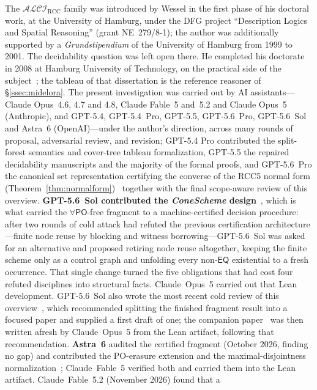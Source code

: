 \documentclass[11pt]{article}
\newcommand{\ALCIRCC}[1]{\mathcal{ALCI}_{\mathrm{RCC#1}}}
\newcommand{\PO}{\mathsf{PO}}
\newcommand{\EQ}{\mathsf{EQ}}
\theoremstyle{plain}
\theoremstyle{definition}
\begin{document}
The $\ALCIRCC{}$ family was introduced by Wessel in the first phase of his
doctoral work, at the University of Hamburg, under the DFG project
``Description Logics and Spatial Reasoning'' (grant NE~279/8-1); the author
was additionally supported by a \emph{Grundstipendium} of the University of
Hamburg from 1999 to 2001. The decidability question was left open there. He
completed his doctorate in 2008 at Hamburg University of Technology, on the
practical side of the subject~\cite{Wessel2008}; the tableau of that
dissertation is the reference reasoner of \S\ref{ssec:midelora}. The
present investigation was carried out by AI assistants---Claude
Opus~4.6, 4.7 and 4.8, Claude Fable~5 and~5.2 and Claude Opus~5 (Anthropic),
and GPT-5.4, GPT-5.4~Pro, GPT-5.5, GPT-5.6~Pro, GPT-5.6~Sol and Astra~6
(OpenAI)---under the
author's direction, across many rounds of proposal, adversarial review, and
revision; GPT-5.4
Pro contributed the split-forest semantics and cover-tree tableau
formalization, GPT-5.5 the repaired decidability manuscripts and the
majority of the formal proofs, and GPT-5.6~Pro the canonical set
representation certifying the converse of the RCC5 normal form
(Theorem~\ref{thm:normalform})~\cite{GPT56TechNote} together with the final
scope-aware review of this overview. \textbf{GPT-5.6~Sol contributed the
\emph{ConeScheme} design}~\cite{GPT56Sol}, which is what carried the
$\forall\PO$-free fragment to a machine-certified decision procedure: after
two rounds of cold attack had refuted the previous certification
architecture---finite node reuse by blocking and witness
borrowing---GPT-5.6~Sol was asked for an alternative and proposed retiring
node reuse altogether, keeping the finite scheme only as a control graph and
unfolding every non-$\EQ$ existential to a fresh occurrence. That single
change turned the five obligations that had cost four refuted disciplines
into structural facts. Claude~Opus~5 carried out that Lean development.
GPT-5.6~Sol also wrote the most recent cold review of this
overview~\cite{GPT56SolReview}, which recommended splitting the finished
fragment result into a focused paper and supplied a first draft of one; the
companion paper~\cite{PofreeFragmentPaper} was then written afresh by
Claude~Opus~5 from the Lean artifact, following that recommendation.
\textbf{Astra~6} audited the certified fragment (October 2026, finding no
gap) and contributed the PO-erasure extension and the maximal-disjointness
normalization~\cite{Astra6Review}; Claude~Fable~5 verified both and carried
them into the Lean artifact. Claude~Fable~5.2 (November 2026) found that a
\end{document}
